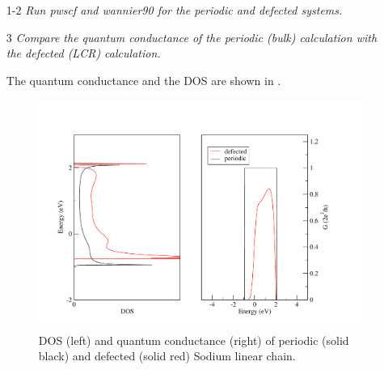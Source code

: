 \begin{enumerate}
\item [1-2] {\it Run pwscf and wannier90 for the periodic and defected systems.}

\item[3] {\it Compare the quantum conductance of the periodic (bulk) calculation with the defected (LCR) calculation.}

The quantum conductance and the DOS are shown in . 

\begin{figure}[b!]
\centering
\includegraphics[width=1.0\columnwidth,height=0.5\columnwidth,trim={20pt 10pt 50pt 50pt},clip]{figure/example14/Na_chain_dos_qc.pdf}
\caption{DOS (left) and quantum conductance (right) of periodic (solid black) and defected (solid red) Sodium linear chain.}\label{fig14.2}
\end{figure}
\end{enumerate}
